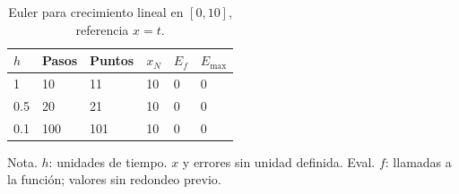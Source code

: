 \begin{table}[H]\centering\small\setlength{\tabcolsep}{4pt}
\caption{Euler para crecimiento lineal en $[0,10]$, referencia $x=t$.}\label{tab:lineal}
\begin{tabular}{llllll}
\toprule
$h$ & Pasos & Puntos & $x_N$ & $E_f$ & $E_{\max}$\\
\midrule
1 & 10 & 11 & 10 & 0 & 0\\
0.5 & 20 & 21 & 10 & 0 & 0\\
0.1 & 100 & 101 & 10 & 0 & 0\\
\bottomrule\end{tabular}
\end{table}
{\footnotesize Nota. $h$: unidades de tiempo. $x$ y errores sin unidad definida. Eval. $f$: llamadas a la función; valores sin redondeo previo.}
